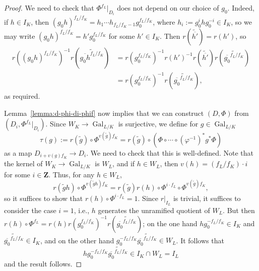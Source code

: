 \documentclass{amsart}
\renewcommand{\mathbb}{\mathbf}
\theoremstyle{definition}
\theoremstyle{remark}
\newcommand{\Z}{\ZZ}
\newcommand{\ZZ}{{\mathbb Z}}
\DeclareMathOperator{\Gal}{Gal}
\begin{document}
\begin{proof}
We need to check that $\Phi^{f_L}|_{D_i}$ does not depend on our
choice of $g_0$.  Indeed, if $h\in I_K$, then
$(g_0h)^{f_L/f_K}=h_1\cdots h_{f_L/f_K-1}g_0^{f_L/f_K}$, where
$h_i:=g_0^ihg_0^{-i}\in I_K$, so we may write
$(g_0h)^{f_L/f_K}=h'g_0^{f_L/f_K}$ for some $h'\in I_K$.  Then
$r(\widetilde{\overline{h'}})=r(h')$, so
\begin{align*}
r((g_0h)^{f_L/f_K})^{-1}r(\widetilde{\overline{g_0h}^{f_L/f_K}})&= r(g_0^{f_L/f_K})^{-1}r(h')^{-1}r(\widetilde{\overline{h'}})r(\widetilde{\overline{g_0}^{f_L/f_K}})	\\
&=r(g_0^{f_L/f_K})^{-1}r(\widetilde{\overline{g_0}^{f_L/f_K}}),
\end{align*}as required.

Lemma~\ref{lemma:d-phi-di-phif} now implies that we can construct $(D,\Phi)$
from $(D_i,\Phi^{f_L}|_{D_i})$.  Since $W_K\rightarrow\Gal_{L/K}$ is
surjective, we define for $g\in\Gal_{L/K}$
\[	\tau(g):=r(\widetilde g)\circ\Phi^{v(\widetilde g)f_K}=r(\widetilde g)\circ\left(\Phi\circ\cdots\circ (\varphi^{-1})^\ast g^\ast\Phi\right)	\] 
as a map $D_{i+ v(g)f_K}\rightarrow D_i$.  We need to check that this is well-defined.  Note that the kernel of $W_K\rightarrow \Gal_{L/K}$ is $W_L$, and if $h\in W_L$, then $v(h)=(f_L/f_K)\cdot i$ for some $i\in\Z$.  Thus, for any $h\in W_L$, 
\[	r(\widetilde g h)\circ\Phi^{v(\widetilde g h)f_K}=r(\widetilde g)r(h)\circ\Phi^{i\cdot f_L}\circ\Phi^{v(\widetilde g)f_K},	\]
so it suffices to show that $r(h)\circ\Phi^{i\cdot f_L}=1$.  Since $r|_{I_L}$ is trivial, it suffices to consider the case $i=1$, i.e., $h$ generates the unramified quotient of $W_L$.  But then $r(h)\circ\Phi^{f_L}=r(h)r(g_0^{f_L/f_K})^{-1}r(\widetilde{\overline{g_0}^{f_L/f_K}})$; on the one hand $hg_0^{-f_L/f_K}\in I_K$ and $\widetilde{\overline{g_0}^{f_L/f_K}}\in I_K$, and on the other hand $g_0^{-f_L/f_K}\widetilde{\overline{g_0}^{f_L/f_K}}\in W_L$.  It follows that 
\[	hg_0^{-f_L/f_K}\widetilde{\overline{g_0}^{f_L/f_K}}\in I_K\cap W_L=I_L	\]
and the result follows.


\end{proof}
\end{document}
